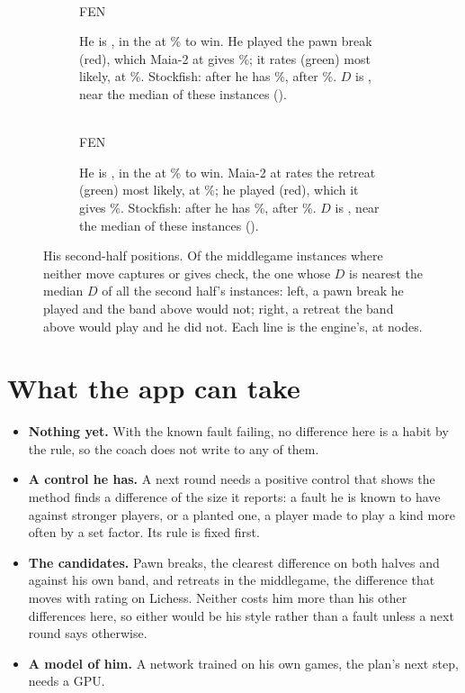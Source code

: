 \documentclass[11pt]{article}
\begin{document}
\begin{figure}[ht]
\centering
\begin{subfigure}[t]{0.48\textwidth}
\centering
\EaBoard\\[0.4em]
{\footnotesize FEN \EaFen}
\caption{He is \EaMover{}, in the \EaPhase{} at \EaWpBefore\% to win. He played the pawn break
\EaPlayed{} (red), which Maia-2 at \EaBand{} gives \EaPPlus\%; it rates \EaTop{} (green) most
likely, at \EaTPlus\%. Stockfish: after \EaLineP{} he has \EaWpP\%, after \EaLineT{} \EaWpT\%.
$D$ is \EaD, near the median of these instances (\EaMedian).}
\label{fig:break}
\end{subfigure}\hfill
\begin{subfigure}[t]{0.48\textwidth}
\centering
\EbBoard\\[0.4em]
{\footnotesize FEN \EbFen}
\caption{He is \EbMover{}, in the \EbPhase{} at \EbWpBefore\% to win. Maia-2 at \EbBand{} rates
the retreat \EbTop{} (green) most likely, at \EbTPlus\%; he played \EbPlayed{} (red), which it
gives \EbPPlus\%. Stockfish: after \EbLineP{} he has \EbWpP\%, after \EbLineT{} \EbWpT\%. $D$ is
\EbD, near the median of these instances (\EbMedian).}
\label{fig:retreat}
\end{subfigure}
\caption{His second-half positions. Of the middlegame instances where neither move captures or
gives check, the one whose $D$ is nearest the median $D$ of all the second half's instances: left,
a pawn break he played and the band above would not; right, a retreat the band above would play
and he did not. Each line is the engine's, at \CostNodes{} nodes.}
\label{fig:examples}
\end{figure}

\section{What the app can take}

\begin{itemize}[nosep]
\item \textbf{Nothing yet.} With the known fault failing, no difference here is a habit by the
  rule, so the coach does not write to any of them.
\item \textbf{A control he has.} A next round needs a positive control that shows the method
  finds a difference of the size it reports: a fault he is known to have against stronger
  players, or a planted one, a player made to play a kind more often by a set factor. Its rule is
  fixed first.
\item \textbf{The candidates.} Pawn breaks, the clearest difference on both halves and against
  his own band, and retreats in the middlegame, the difference that moves with rating on Lichess.
  Neither costs him more than his other differences here, so either would be his style rather
  than a fault unless a next round says otherwise.
\item \textbf{A model of him.} A network trained on his own games, the plan's next step, needs a
  GPU.
\end{itemize}
\end{document}
